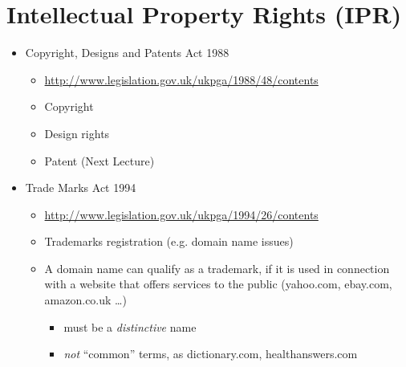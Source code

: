 \documentclass{article}
\begin{document}
\section{Intellectual Property Rights (IPR)}
\begin{itemize}
\item Copyright, Designs and Patents Act 1988
\begin{itemize}
\item \url{http://www.legislation.gov.uk/ukpga/1988/48/contents}
\item Copyright
\item Design rights
\item Patent (Next Lecture)
\end{itemize}
\item Trade Marks Act 1994 
\begin{itemize}
\item \url{http://www.legislation.gov.uk/ukpga/1994/26/contents}
\item Trademarks registration (e.g. domain name issues)
\item A domain name can qualify as a trademark, if it is used in connection with a website that offers services to the public
 (yahoo.com, ebay.com, amazon.co.uk \ldots)
\begin{itemize}
\item must be a \emph{distinctive} name
\item \emph{not} ``common'' terms, as dictionary.com, healthanswers.com
\end{itemize}
\end{itemize}
\end{itemize}
\end{document}

